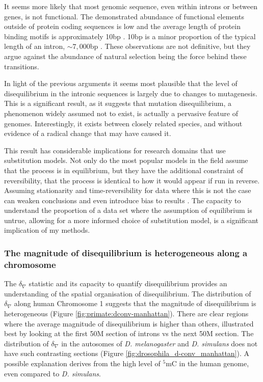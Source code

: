 It seems more likely that most genomic sequence, even within introns or between genes, is not functional. The demonstrated abundance of functional elements outside of protein coding sequences is low \citep{Graur2013OnENCODE} and the average length of protein binding motifs is approximately 10bp \citep{Stewart2012WhyLong}. 10bp is a minor proportion of the typical length of an intron, $\sim7,000$bp \citep{10.1093/database/baw153}. These observations are not definitive, but they argue against the abundance of natural selection being the force behind these transitions. 

In light of the previous arguments it seems most plausible that the level of disequilibrium in the intronic sequences is largely due to changes to mutagenesis.  This is a significant result, as it suggests that mutation disequilibrium, a phenomenon widely assumed not to exist, is actually a pervasive feature of genomes. Interestingly, it exists between closely related species, and without evidence of a radical change that may have caused it. 

This result has considerable implications for research domains that use substitution models. Not only do the most popular models in the field assume that the process is in equilibrium, but they have the additional constraint of reversibility, that the process is identical to how it would appear if run in reverse. Assuming stationarity and time-reversibility for data where this is not the case can weaken conclusions and even introduce bias to results \citep{Kaehler2015}. The capacity to understand the proportion of a data set where the assumption of equilibrium is untrue, allowing for a more informed choice of substitution model, is a significant implication of my methods.  

\subsubsection{The magnitude of disequilibrium is heterogeneous along a chromosome }

The $\delta_\nabla$ statistic and its capacity to quantify disequilibrium provides an understanding of the spatial organisation of disequilibrium. The distribution of $\delta_\nabla$ along human Chromosome 1 suggests that the magnitude of disequilibrium is heterogeneous (Figure \ref{fig:primate:dconv-manhattan}). There are clear regions where the average magnitude of disequilibrium is higher than others, illustrated best by looking at the first 50M section of introns vs the next 50M section. The distribution of $\delta_\nabla$ in the autosomes of \textit{D. melanogaster} and \textit{D. simulans} does not have such contrasting sections (Figure \ref{fig:drosophila_d-conv_manhattan}). A possible explanation derives from the high level of $^5$mC in the human genome, even compared to \textit{D. simulans}. 

